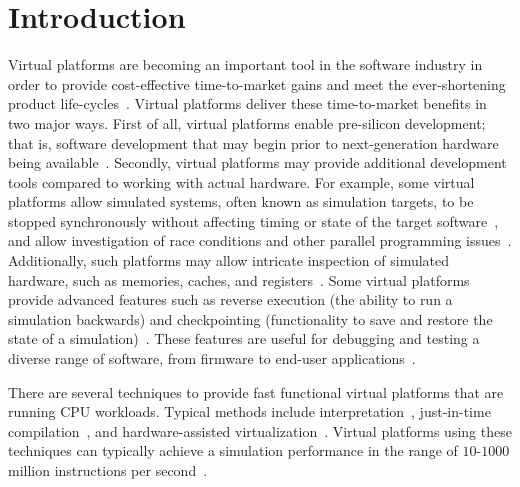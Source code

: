 
\section{Introduction}
\label{sec:introduction}
Virtual platforms are becoming an important tool in the software industry in order to provide cost-effective time-to-market gains and meet the ever-shortening product life-cycles~\cite{journals:magnusson:2002, journals:yi:2006, publications:leupers:2010, publications:aarno:2014}.
Virtual platforms deliver these time-to-market benefits in two major ways.
First of all, virtual platforms enable pre-silicon development; that is, software development that may begin prior to next-generation hardware being available~.
Secondly, virtual platforms may provide additional development tools compared to working with actual hardware.
For example, some virtual platforms allow simulated systems, often known as simulation targets, to be stopped synchronously without affecting timing or state of the target software~, and allow investigation of race conditions and other parallel programming issues~.
Additionally, such platforms may allow intricate inspection of simulated hardware, such as memories, caches, and registers~.
Some virtual platforms provide advanced features such as reverse execution (the ability to run a simulation backwards) and checkpointing (functionality to save and restore the state of a simulation)~.
These features are useful for debugging and testing a diverse range of software, from firmware to end-user applications~.

There are several techniques to provide fast functional virtual platforms that are running CPU workloads.
Typical methods include interpretation~, just-in-time compilation~, and hardware-assisted virtualization~.
Virtual platforms using these techniques can typically achieve a simulation performance in the range of $10$-$1000$ million instructions per second~.

